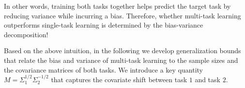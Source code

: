 In other words, training both tasks together helps predict the target task by reducing variance while incurring a bias.
Therefore, whether multi-task learning outperforms single-task learning is determined by the bias-variance decomposition!

 
Based on the above intuition, in the following we develop generalization bounds that relate the bias and variance of multi-task learning to the sample sizes and the covariance matrices of both tasks.
We introduce a key quantity $M = \Sigma_1^{1/2}\Sigma_2^{-1/2}$ that captures the covariate shift between task $1$ and task $2$.


